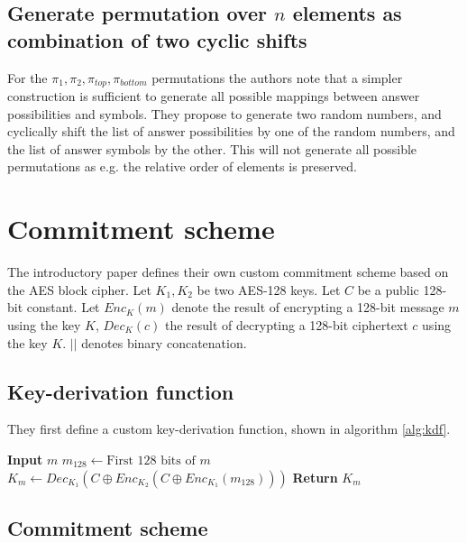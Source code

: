 \subsection{Generate permutation over $n$ elements as combination of two cyclic shifts}
\label{sec:permutations_via_shifts}

For the $\pi_1, \pi_2, \pi_{top}, \pi_{bottom}$ permutations the authors note
that a simpler construction is sufficient to generate all possible mappings
between answer possibilities and symbols. They propose to generate two random
numbers, and cyclically shift the list of answer possibilities by one of the
random numbers, and the list of answer symbols by the other. This will not
generate all possible permutations as e.g. the relative order of elements is
preserved.

\section{Commitment scheme}
\label{sec:commitment_scheme}

The introductory paper defines their own custom commitment scheme based on the
AES block cipher\autocite[section 9]{fisherPunchscanIntroductionSystem2006}.
Let $K_1, K_2$ be two AES-128 keys. Let $C$ be a public 128-bit constant. Let
$Enc_K(m)$ denote the result of encrypting a 128-bit message $m$ using the key
$K$, $Dec_K(c)$ the result of decrypting a 128-bit ciphertext $c$ using the key
$K$. $||$ denotes binary concatenation.

\subsection{Key-derivation function}

They first define a custom key-derivation function, shown in algorithm
\ref{alg:kdf}.

\begin{algorithm}
	\begin{algorithmic}
		\State \textbf{Input} $m$
		\State $m_{128} \gets \text{First 128 bits of } m$ 
		\State $K_m \gets Dec_{K_1}(C \oplus Enc_{K_2}(C \oplus Enc_{K_1}(m_{128})))$
		\State \textbf{Return} $K_m$
	\end{algorithmic}
	\caption{$KDF(m)$}
	\label{alg:kdf}
\end{algorithm}

\subsection{Commitment scheme}

